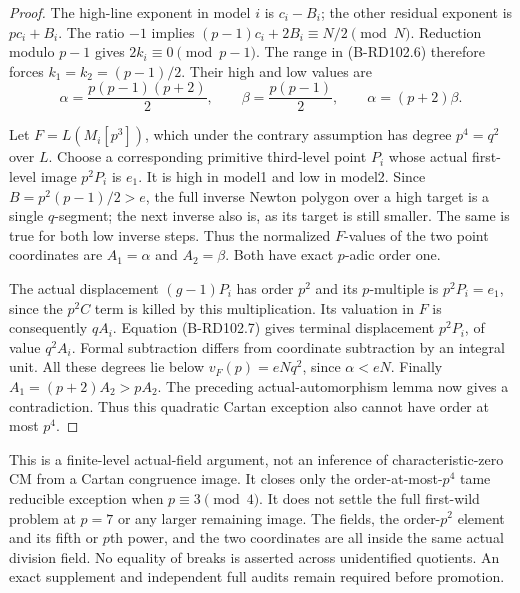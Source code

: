 \begin{proof}
The high-line exponent in model $i$ is $c_i-B_i$;
the other residual exponent is $pc_i+B_i$.
The ratio $-1$ implies
$(p-1)c_i+2B_i\equiv N/2\pmod N$.
Reduction modulo $p-1$ gives $2k_i\equiv0\pmod{p-1}$.
The range in (B-RD102.6) therefore forces
$k_1=k_2=(p-1)/2$. Their high and low values are
\[
 \alpha=\frac{p(p-1)(p+2)}2,\qquad
 \beta=\frac{p(p-1)}2,\qquad \alpha=(p+2)\beta .
                                                        \tag{B-RD102.8}
\]

Let $F=L(M_i[p^3])$, which under the contrary
assumption has degree $p^4=q^2$ over $L$.
Choose a corresponding primitive third-level point
$P_i$ whose actual first-level image $p^2P_i$
is $e_1$. It is high in model1 and low in model2.
Since $B=p^2(p-1)/2>e$, the full inverse Newton
polygon over a high target is a single $q$-segment;
the next inverse also is, as its target is still smaller.
The same is true for both low inverse steps.
Thus the normalized $F$-values of the two point
coordinates are $A_1=\alpha$ and $A_2=\beta$.
Both have exact $p$-adic order one.

The actual displacement $(g-1)P_i$ has order $p^2$
and its $p$-multiple is $p^2P_i=e_1$, since the
$p^2C$ term is killed by this multiplication.
Its valuation in $F$ is consequently $qA_i$.
Equation (B-RD102.7) gives terminal displacement
$p^2P_i$, of value $q^2A_i$.
Formal subtraction differs from coordinate subtraction
by an integral unit. All these degrees lie below
$v_F(p)=eNq^2$, since $\alpha<eN$.
Finally $A_1=(p+2)A_2>pA_2$.
The preceding actual-automorphism lemma now gives
a contradiction. Thus this quadratic Cartan exception
also cannot have order at most $p^4$.
\end{proof}

\begin{remark}
\label{rem:B-RD102-scope}
This is a finite-level actual-field argument, not an
inference of characteristic-zero CM from a Cartan
congruence image. It closes only the order-at-most-$p^4$
tame reducible exception when $p\equiv3\pmod4$.
It does not settle the full first-wild problem at
$p=7$ or any larger remaining image.
The fields, the order-$p^2$ element and its fifth or
$p$th power, and the two coordinates are all inside
the same actual division field.
No equality of breaks is asserted across unidentified
quotients. An exact supplement and independent full
audits remain required before promotion.
\end{remark}
